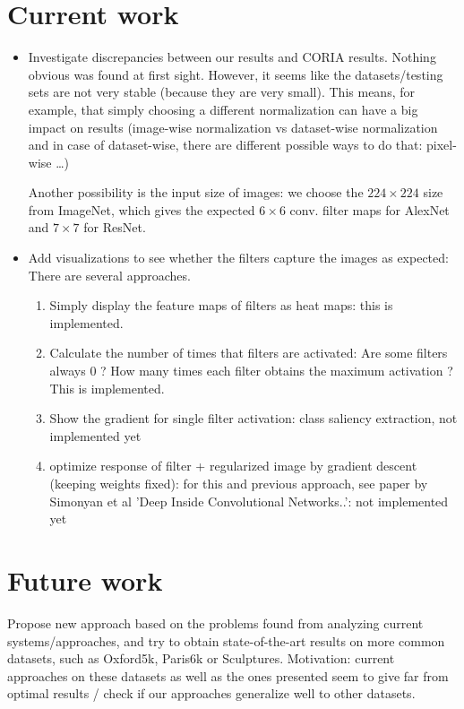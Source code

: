 \documentclass[fleqn]{article}
\begin{document}
\section{Current work}
\begin{itemize}
    \item Investigate discrepancies between our results and CORIA results.
    Nothing obvious was found at first sight. However, it seems like
    the datasets/testing sets are not very stable (because they are very small).
    This means, for example, that simply choosing a different normalization
    can have a big impact on results (image-wise normalization vs
    dataset-wise normalization and in case of dataset-wise, there are
    different possible ways to do that: pixel-wise \dots)

    Another possibility is the input size of images: we choose the
    $224\times224$ size from ImageNet, which gives the expected
    $6\times6$ conv. filter maps for AlexNet and $7\times7$ for ResNet.
    \item Add visualizations to see whether the filters capture the
    images as expected: There are several approaches.
    \begin{enumerate}
        \item Simply display the feature maps of filters as heat maps:
        this is implemented.
        \item Calculate the number of times that filters are activated:
        Are some filters always 0 ? How many times each filter obtains
        the maximum activation ?
        This is implemented.
        \item Show the gradient for single filter activation:
        class saliency extraction, not implemented yet
        \item optimize response of filter +
        regularized image by gradient descent (keeping weights fixed):
        for this and previous approach, see paper by
        Simonyan et al 'Deep Inside Convolutional Networks..':
        not implemented yet
    \end{enumerate}
\end{itemize}

\section{Future work}
Propose new approach based on the problems found from analyzing current
systems/approaches, and try to obtain state-of-the-art results on
more common datasets, such as Oxford5k, Paris6k or Sculptures.
Motivation: current approaches on these datasets as well as
the ones presented seem to give far from optimal results / check
if our approaches generalize well to other datasets.
\end{document}
